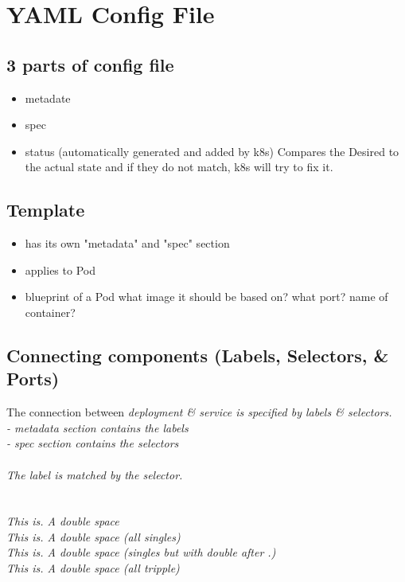 \section{YAML Config File}\label{sec:yaml-config-file}

\subsection{3 parts of config file}\label{subsec:3-parts-of-config-file}
\begin{itemize}
    \item metadate
    \item spec
    \item status (automatically generated and added by k8s)
    \subitem Compares the Desired to the actual state
    \subitem and if they do not match, k8s will try to fix it.
\end{itemize}

\subsection{Template}\label{subsec:template}
\begin{itemize}
    \item has its own "metadata" and "spec" section
    \item applies to Pod
    \item blueprint of a Pod
    \subitem what image it should be based on?
    \subitem what port?
    \subitem name of container?
\end{itemize}

\subsection{Connecting components (Labels, Selectors, \& Ports)}\label{subsec:connecting-componentsnulllabels,-selectors,portsnull}
The connection between \it{deployment} \& \it{service} is specified by \it{labels} \& \it{selectors}.\\
 - metadata section contains the labels\\
 - spec section contains the selectors\\\\
The label is matched by the selector.
\\\\\\
This  is.  A  double  space \\
This is. A double space (all singles)\\
This is.  A double space (singles but with double after .)\\
This   is.   A   double    space (all tripple)